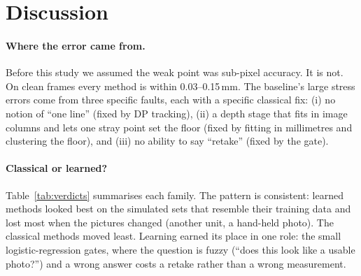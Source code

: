 \section{Discussion}\label{sec:discussion}

\paragraph{Where the error came from.} Before this study we assumed the weak point was sub-pixel accuracy. It is
not. On clean frames every method is within 0.03--0.15\,mm. The baseline's large stress errors come from three
specific faults, each with a specific classical fix: (i) no notion of ``one line'' (fixed by DP tracking), (ii) a
depth stage that fits in image columns and lets one stray point set the floor (fixed by fitting in millimetres and
clustering the floor), and (iii) no ability to say ``retake'' (fixed by the gate).

\paragraph{Classical or learned?} Table~\ref{tab:verdicts} summarises each family. The pattern is consistent:
learned methods looked best on the simulated sets that resemble their training data and lost most when the
pictures changed (another unit, a hand-held photo). The classical methods moved least. Learning earned its place in
one role: the small logistic-regression gates, where the question is fuzzy (``does this look like a usable photo?'')
and a wrong answer costs a retake rather than a wrong measurement.

